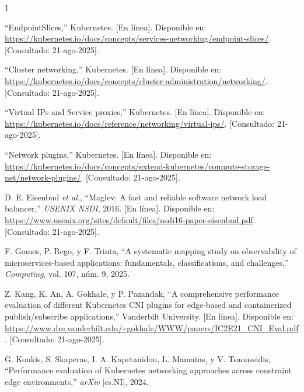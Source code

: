 \documentclass[journal]{IEEEtran}
\begin{document}
%
%
%
\begin{thebibliography}{1}

``EndpointSlices,'' Kubernetes. [En línea]. Disponible en: \url{https://kubernetes.io/docs/concepts/services-networking/endpoint-slices/}. [Consultado: 21-ago-2025].

``Cluster networking,'' Kubernetes. [En línea]. Disponible en: \url{https://kubernetes.io/docs/concepts/cluster-administration/networking/}. [Consultado: 21-ago-2025].

``Virtual IPs and Service proxies,'' Kubernetes. [En línea]. Disponible en: \url{https://kubernetes.io/docs/reference/networking/virtual-ips/}. [Consultado: 21-ago-2025].

``Network plugins,'' Kubernetes. [En línea]. Disponible en: \url{https://kubernetes.io/docs/concepts/extend-kubernetes/compute-storage-net/network-plugins/}. [Consultado: 21-ago-2025].

D. E. Eisenbud \emph{et al.}, ``Maglev: A fast and reliable software network load balancer,'' \emph{USENIX NSDI}, 2016. [En línea]. Disponible en: \url{https://www.usenix.org/sites/default/files/nsdi16-paper-eisenbud.pdf}. [Consultado: 21-ago-2025].

F. Gomes, P. Rego, y F. Trinta, ``A systematic mapping study on observability of microservices-based applications: fundamentals, classifications, and challenges,'' \emph{Computing}, vol. 107, núm. 9, 2025.

Z. Kang, K. An, A. Gokhale, y P. Pazandak, ``A comprehensive performance evaluation of different Kubernetes CNI plugins for edge-based and containerized publish/subscribe applications,'' Vanderbilt University. [En línea]. Disponible en: \url{https://www.dre.vanderbilt.edu/~gokhale/WWW/papers/IC2E21_CNI_Eval.pdf}. [Consultado: 21-ago-2025].

G. Koukis, S. Skaperas, I. A. Kapetanidou, L. Mamatas, y V. Tsaoussidis, ``Performance evaluation of Kubernetes networking approaches across constraint edge environments,'' \emph{arXiv} [cs.NI], 2024.


\end{thebibliography}
\end{document}
